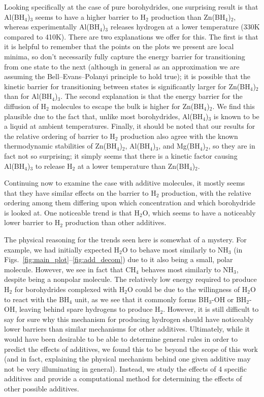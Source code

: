 \documentclass[twocolumn, prb, showpacs]{revtex4-1}
\begin{document}
Looking specifically at the case of pure borohydrides, one surprising result is that Al(BH$_4$)$_3$ seems to have a higher barrier
to H$_2$ production than Zn(BH$_4$)$_2$, whereas experimentally Al(BH$_4$)$_3$
releases hydrogen at a lower temperature (330K compared to 410K)\cite{Nakamori_2007:thermodynamical_stabilities}. There are
two explanations we offer for this. The first is that it is helpful to remember
that the points on the plots we present are local minima, so don't necessarily fully capture the energy
barrier for transitioning from one state to the next (although in general as an approximation
we are assuming the Bell--Evans--Polanyi principle to hold true); it is possible that 
the kinetic barrier for transitioning between states is significantly larger for
Zn(BH$_4$)$_2$ than for Al(BH$_4$)$_3$. The second explanation is that the
energy barrier for the diffusion of H$_2$ molecules to escape the bulk is 
higher for Zn(BH$_4$)$_2$. We find this plausible due to the fact that, unlike most borohydrides,
Al(BH$_4$)$_3$ is known to be a liquid at ambient temperatures.
Finally, it should be noted that our results for the relative ordering of barrier to H$_2$
production also agree with the known thermodynamic stabilities of Zn(BH$_4$)$_2$,
Al(BH$_4$)$_3$, and Mg(BH$_4$)$_2$, so they are in fact not so surprising; it simply
seems that there is a kinetic factor causing Al(BH$_4$)$_3$ to release H$_2$ at a
lower temperature than Zn(BH$_4$)$_2$.


Continuing now to examine the case with additive molecules, it mostly seems that they
have similar effects on the barrier to H$_2$ production, with the relative
ordering among them differing upon which concentration and which borohydride 
is looked at. One noticeable trend is that H$_2$O, which seems to have a 
noticeably lower barrier to H$_2$ production than other additives. 

The physical reasoning for the trends seen here is somewhat of a mystery.
For example, we had initially expected H$_2$O to behave most similarly to
NH$_3$ (in Figs.~\ref{fig:main_plot}--\ref{fig:add_decom}) due to it also being a small, polar molecule.
However, we see in fact that CH$_4$ behaves most similarly to NH$_3$, despite being a nonpolar
molecule. The relatively low energy required to produce H$_2$ for borohydrides complexed
with H$_2$O could be due to the willingness of H$_2$O to react with the BH$_4$ unit, 
as we see that it commonly forms BH$_3$-OH or BH$_2$-OH, leaving behind spare hydrogens to produce H$_2$.
However, it is still difficult to say for sure why this mechanism for producing hydrogen should have
noticeably lower barriers than similar mechanisms for other additives. Ultimately, while it 
would have been desirable to be able to determine general rules in order to predict
the effects of additives, we found this to be beyond the scope of this work (and in fact,
explaining the physical mechanism behind one given additive may not be very illuminating
in general). Instead, we study the effects of 4 specific additives and provide a computational
method for determining the effects of other possible additives.
\end{document}
